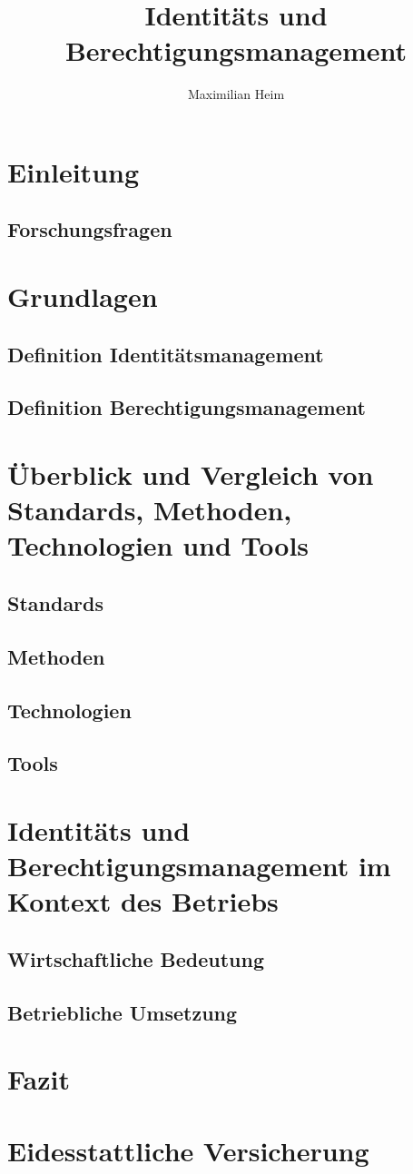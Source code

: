 \documentclass[10pt]{article}
\author{Maximilian Heim}
\title{Identitäts und Berechtigungsmanagement}
\begin{document}
\maketitle
\newpage
\tableofcontents
\newpage
\section{Einleitung}
\subsection{Forschungsfragen}
\section{Grundlagen}
\subsection{Definition Identitätsmanagement}
\subsection{Definition Berechtigungsmanagement}
\section{Überblick und Vergleich von Standards, Methoden, Technologien und Tools}
\subsection{Standards}
\subsection{Methoden}
\subsection{Technologien}
\subsection{Tools}
\section{Identitäts und Berechtigungsmanagement im Kontext des Betriebs}
\subsection{Wirtschaftliche Bedeutung}
\subsection{Betriebliche Umsetzung}
\section{Fazit}
\section{Eidesstattliche Versicherung}
\end{document}
